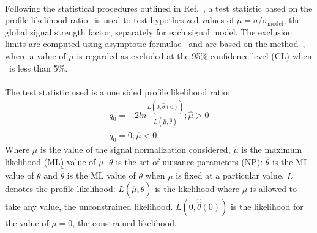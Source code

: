 
\paragraph{}
Following the statistical procedures outlined in Ref.~\cite{Aad:2012tfa}, a test statistic based on the profile likelihood ratio~\cite{Cowan:2010js} is used to test hypothesized values of $\mu=\sigma/\sigma_{\mathrm{model}}$, the global signal strength factor, separately for each signal model. 
The exclusion limits are computed using asymptotic formulae~\cite{Cowan:2010js} and are based on the \cls method~\cite{Read:2002hq}, where a value of $\mu$ is regarded as excluded at the 95\% confidence level (CL) when \cls~is less than 5\%.

\paragraph{}
The test statistic used is a one sided profile likelihood ratio:
\begin{eqnarray}
  {q_{0}} = -2 ln \frac{L(0,\hat{\hat{\theta}}(0))}{L(\hat{\mu},\hat{\theta})}; \hat{\mu} > 0 \\
  {q_{0}} =  0 ; \hat{\mu} < 0 
\end{eqnarray}
Where $\mu$ is the value of the signal normalization considered, $\hat{\mu}$ is the maximum likelihood (ML) value of $\mu$. 
$\theta$ is the set of nuisance parameters (NP): $\hat{\theta}$ is the ML value of $\theta$ and 
$\hat{\hat{\theta}}$ is the ML value of $\theta$ when $\mu$ is fixed at a particular value. 
$L$ denotes the profile likelihood: $L(\hat{\mu},\hat{\theta})$ is the likelihood where $\mu$ is allowed to take any value, the unconstrained likelihood. 
$L(0,\hat{\hat{\theta}}(0))$ is the likelihood for the value of $\mu = 0$, the constrained likelihood.

